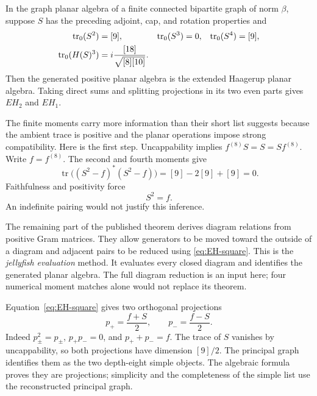 \begin{theorem}
\label{thm:EH-moment-criterion}
In the graph planar algebra of a finite connected bipartite
graph of norm $\beta$, suppose $S$ has
the preceding adjoint, cap, and rotation properties and
\begin{align}
 \operatorname{tr}_0(S^2)&=[9],&
 \operatorname{tr}_0(S^3)&=0,&
 \operatorname{tr}_0(S^4)&=[9],\notag\\
 \operatorname{tr}_0(H(S)^3)&=
       i\frac{[18]}{\sqrt{[8][10]}}.
 \label{eq:EH-moments}
\end{align}
Then the generated positive planar algebra is the extended
Haagerup planar algebra. Taking direct sums and splitting
projections in its two even parts gives $EH_2$ and $EH_1$.
\end{theorem}

The finite moments carry more information than their short list
suggests because the ambient trace is positive and the planar
operations impose strong compatibility. Here is the first step.
Uncappability implies $f^{(8)}S=S=Sf^{(8)}$. Write $f=f^{(8)}$.
The second and fourth moments give
\[
 \operatorname{tr}\bigl((S^2-f)^*(S^2-f)\bigr)
 =[9]-2[9]+[9]=0.
\]
Faithfulness and positivity force
\begin{equation}
 S^2=f.
 \label{eq:EH-square}
\end{equation}
An indefinite pairing would not justify this inference.

The remaining part of the published theorem derives diagram
relations from positive Gram matrices. They allow generators
to be moved toward the outside of a diagram and adjacent pairs
to be reduced using \eqref{eq:EH-square}. This is the
\emph{jellyfish evaluation} method. It evaluates every closed
diagram and identifies the generated planar algebra. The full
diagram reduction is an input here; four numerical moment
matches alone would not replace its theorem.

\begin{example}
Equation~\eqref{eq:EH-square} gives two orthogonal projections
\[
 p_+=\frac{f+S}{2},\qquad p_-=\frac{f-S}{2}.
\]
Indeed $p_\pm^2=p_\pm$, $p_+p_-=0$, and $p_++p_-=f$.
The trace of $S$ vanishes by uncappability, so both projections
have dimension $[9]/2$. The principal graph identifies them as
the two depth-eight simple objects. The algebraic formula proves
they are projections; simplicity and the completeness of the
simple list use the reconstructed principal graph.
\end{example}

